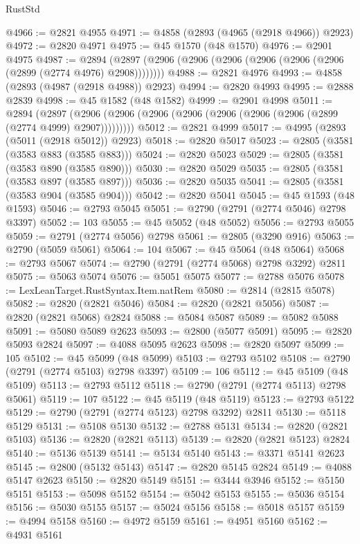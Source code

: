 \begin{lexlean}{RustStd}
\begin{coremodule}
@4966 := @2821 @4955
@4971 := @4858 (@2893 (@4965 (@2918 @4966)) @2923)
@4972 := @2820 @4971
@4975 := @45 @1570 (@48 @1570)
@4976 := @2901 @4975
@4987 := @2894 (@2897 (@2906 (@2906 (@2906 (@2906 (@2906 (@2906 (@2899 (@2774 @4976) @2908))))))))
@4988 := @2821 @4976
@4993 := @4858 (@2893 (@4987 (@2918 @4988)) @2923)
@4994 := @2820 @4993
@4995 := @2888 @2839
@4998 := @45 @1582 (@48 @1582)
@4999 := @2901 @4998
@5011 := @2894
    (@2897 (@2906 (@2906 (@2906 (@2906 (@2906 (@2906 (@2906 (@2899 (@2774 @4999) @2907)))))))))
@5012 := @2821 @4999
@5017 := @4995 (@2893 (@5011 (@2918 @5012)) @2923)
@5018 := @2820 @5017
@5023 := @2805 (@3581 (@3583 @883 (@3585 @883)))
@5024 := @2820 @5023
@5029 := @2805 (@3581 (@3583 @890 (@3585 @890)))
@5030 := @2820 @5029
@5035 := @2805 (@3581 (@3583 @897 (@3585 @897)))
@5036 := @2820 @5035
@5041 := @2805 (@3581 (@3583 @904 (@3585 @904)))
@5042 := @2820 @5041
@5045 := @45 @1593 (@48 @1593)
@5046 := @2793 @5045
@5051 := @2790 (@2791 (@2774 @5046) @2798 @3397)
@5052 := 103
@5055 := @45 @5052 (@48 @5052)
@5056 := @2793 @5055
@5059 := @2791 (@2774 @5056) @2798
@5061 := @2805 (@3290 @916)
@5063 := @2790 (@5059 @5061)
@5064 := 104
@5067 := @45 @5064 (@48 @5064)
@5068 := @2793 @5067
@5074 := @2790 (@2791 (@2774 @5068) @2798 @3292) @2811
@5075 := @5063 @5074
@5076 := @5051 @5075
@5077 := @2788 @5076
@5078 := LexLeanTarget.RustSyntax.Item.natRem
@5080 := @2814 (@2815 @5078)
@5082 := @2820 (@2821 @5046)
@5084 := @2820 (@2821 @5056)
@5087 := @2820 (@2821 @5068) @2824
@5088 := @5084 @5087
@5089 := @5082 @5088
@5091 := @5080 @5089 @2623
@5093 := @2800 (@5077 @5091)
@5095 := @2820 @5093 @2824
@5097 := @4088 @5095 @2623
@5098 := @2820 @5097
@5099 := 105
@5102 := @45 @5099 (@48 @5099)
@5103 := @2793 @5102
@5108 := @2790 (@2791 (@2774 @5103) @2798 @3397)
@5109 := 106
@5112 := @45 @5109 (@48 @5109)
@5113 := @2793 @5112
@5118 := @2790 (@2791 (@2774 @5113) @2798 @5061)
@5119 := 107
@5122 := @45 @5119 (@48 @5119)
@5123 := @2793 @5122
@5129 := @2790 (@2791 (@2774 @5123) @2798 @3292) @2811
@5130 := @5118 @5129
@5131 := @5108 @5130
@5132 := @2788 @5131
@5134 := @2820 (@2821 @5103)
@5136 := @2820 (@2821 @5113)
@5139 := @2820 (@2821 @5123) @2824
@5140 := @5136 @5139
@5141 := @5134 @5140
@5143 := @3371 @5141 @2623
@5145 := @2800 (@5132 @5143)
@5147 := @2820 @5145 @2824
@5149 := @4088 @5147 @2623
@5150 := @2820 @5149
@5151 := @3444 @3946
@5152 := @5150 @5151
@5153 := @5098 @5152
@5154 := @5042 @5153
@5155 := @5036 @5154
@5156 := @5030 @5155
@5157 := @5024 @5156
@5158 := @5018 @5157
@5159 := @4994 @5158
@5160 := @4972 @5159
@5161 := @4951 @5160
@5162 := @4931 @5161

\end{coremodule}
\end{lexlean}
